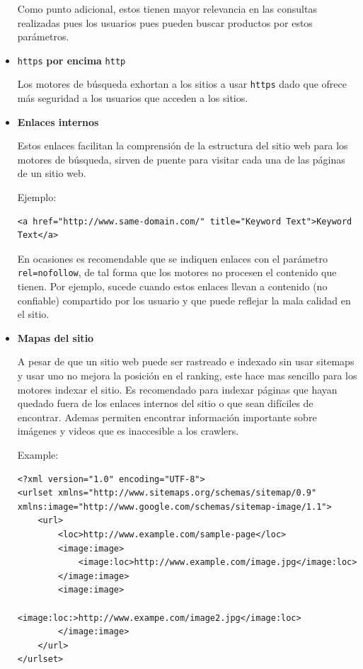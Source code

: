 \documentclass[12pt]{llncs}
\begin{document}
\begin{itemize}
Como punto adicional, estos tienen mayor relevancia en las consultas realizadas pues los usuarios pues pueden buscar productos por estos parámetros.

\item \verb+https+ \textbf{por encima} \verb+http+

Los motores de búsqueda exhortan a los sitios a usar \verb+https+ dado que ofrece más seguridad a los usuarios que acceden a los sitios.

\item \textbf{Enlaces internos}

Estos enlaces facilitan la comprensión de la estructura del sitio web para los motores de búsqueda, sirven de puente para visitar cada una de las páginas de un sitio web.

Ejemplo:
\begin{lstlisting}
<a href="http://www.same-domain.com/" title="Keyword Text">Keyword Text</a>    
\end{lstlisting}

En ocasiones es recomendable que se indiquen enlaces con el parámetro \verb+rel=nofollow+, de tal forma que los motores no procesen el contenido que tienen. Por ejemplo, sucede cuando estos enlaces llevan a contenido (no confiable) compartido por los usuario y que puede reflejar la mala calidad en el sitio.

\item \textbf{Mapas del sitio} \cite{sitemaps}

A pesar de que un sitio web puede ser rastreado e indexado sin usar sitemaps y usar uno no mejora la posición en el ranking, este hace mas sencillo para los motores indexar el sitio. Es recomendado para indexar páginas que hayan quedado fuera de los enlaces internos del sitio o que sean difíciles de encontrar. Ademas permiten encontrar información importante sobre imágenes y videos que es inaccesible a los crawlers.

Example:
\lstset{language=XML}
\begin{lstlisting}
<?xml version="1.0" encoding="UTF-8">
<urlset xmlns="http://www.sitemaps.org/schemas/sitemap/0.9" xmlns:image="http://www.google.com/schemas/sitemap-image/1.1">
    <url>
        <loc>http://www.example.com/sample-page</loc>
        <image:image>
            <image:loc>http://www.example.com/image.jpg</image:loc>
        </image:image>
        <image:image>
            <image:loc:>http://www.exampe.com/image2.jpg</image:loc>
        </image:image>
    </url>
</urlset>
\end{lstlisting}


\end{itemize}
\end{document}
